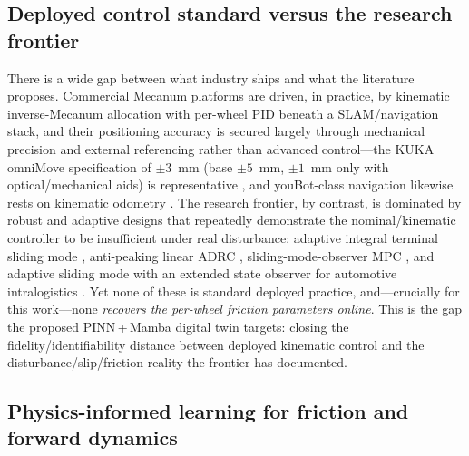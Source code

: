 \documentclass[11pt]{article}
\begin{document}
\subsection{Deployed control standard versus the research frontier}
\label{sec:related-deployed}

There is a wide gap between what industry ships and what the literature proposes.
Commercial Mecanum platforms are driven, in practice, by kinematic inverse-Mecanum
allocation with per-wheel PID beneath a SLAM/navigation stack, and their positioning
accuracy is secured largely through mechanical precision and external referencing
rather than advanced control---the KUKA omniMove specification of $\pm3$~mm
(base $\pm5$~mm, $\pm1$~mm only with optical/mechanical aids) is representative
\cite{kuka_omnimove,kuka_aerospace}, and youBot-class navigation likewise rests on
kinematic odometry \cite{adamov2018youbot}. The research frontier, by contrast, is
dominated by robust and adaptive designs that repeatedly demonstrate the
nominal/kinematic controller to be insufficient under real disturbance: adaptive
integral terminal sliding mode \cite{aitsm2021}, anti-peaking linear ADRC
\cite{antipeaking2024}, sliding-mode-observer MPC \cite{avpsmo2024}, and adaptive
sliding mode with an extended state observer for automotive intralogistics
\cite{bui2025hybrid}. Yet none of these is standard deployed practice, and---crucially
for this work---none \emph{recovers the per-wheel friction parameters online}. This
is the gap the proposed PINN\,+\,Mamba digital twin targets: closing the
fidelity/identifiability distance between deployed kinematic control and the
disturbance/slip/friction reality the frontier has documented.

\subsection{Physics-informed learning for friction and forward dynamics}
\label{sec:related-pinn}
\end{document}
